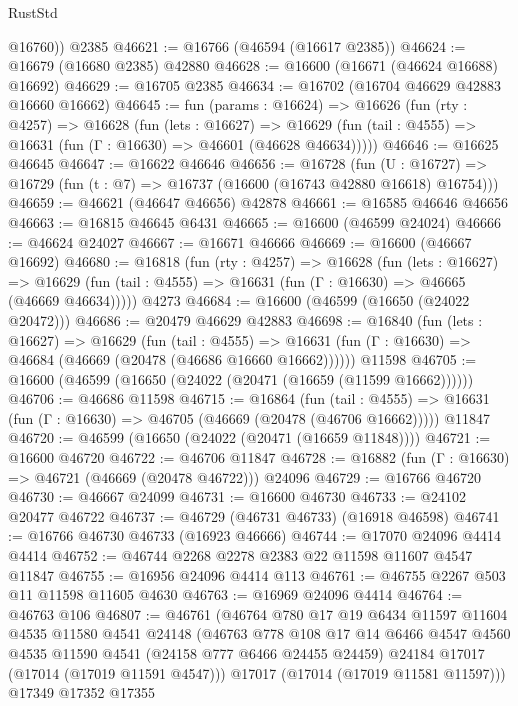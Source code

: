 \begin{lexlean}{RustStd}
\begin{coremodule}
        @16760))
    @2385
@46621 := @16766 (@46594 (@16617 @2385))
@46624 := @16679 (@16680 @2385) @42880
@46628 := @16600 (@16671 (@46624 @16688) @16692)
@46629 := @16705 @2385
@46634 := @16702 (@16704 @46629 @42883 @16660 @16662)
@46645 := fun (params : @16624) =>
  @16626
    (fun (rty : @4257) =>
    @16628
      (fun (lets : @16627) =>
      @16629 (fun (tail : @4555) => @16631 (fun (Γ : @16630) => @46601 (@46628 @46634)))))
@46646 := @16625 @46645
@46647 := @16622 @46646
@46656 := @16728
    (fun (U : @16727) => @16729 (fun (t : @7) => @16737 (@16600 (@16743 @42880 @16618) @16754)))
@46659 := @46621 (@46647 @46656) @42878
@46661 := @16585 @46646 @46656
@46663 := @16815 @46645 @6431
@46665 := @16600 (@46599 @24024)
@46666 := @46624 @24027
@46667 := @16671 @46666
@46669 := @16600 (@46667 @16692)
@46680 := @16818
    (fun (rty : @4257) =>
    @16628
      (fun (lets : @16627) =>
      @16629 (fun (tail : @4555) => @16631 (fun (Γ : @16630) => @46665 (@46669 @46634)))))
    @4273
@46684 := @16600 (@46599 (@16650 (@24022 @20472)))
@46686 := @20479 @46629 @42883
@46698 := @16840
    (fun (lets : @16627) =>
    @16629
      (fun (tail : @4555) =>
      @16631 (fun (Γ : @16630) => @46684 (@46669 (@20478 (@46686 @16660 @16662))))))
    @11598
@46705 := @16600 (@46599 (@16650 (@24022 (@20471 (@16659 (@11599 @16662))))))
@46706 := @46686 @11598
@46715 := @16864
    (fun (tail : @4555) => @16631 (fun (Γ : @16630) => @46705 (@46669 (@20478 (@46706 @16662)))))
    @11847
@46720 := @46599 (@16650 (@24022 (@20471 (@16659 @11848))))
@46721 := @16600 @46720
@46722 := @46706 @11847
@46728 := @16882 (fun (Γ : @16630) => @46721 (@46669 (@20478 @46722))) @24096
@46729 := @16766 @46720
@46730 := @46667 @24099
@46731 := @16600 @46730
@46733 := @24102 @20477 @46722
@46737 := @46729 (@46731 @46733) (@16918 @46598)
@46741 := @16766 @46730 @46733 (@16923 @46666)
@46744 := @17070 @24096 @4414 @4414
@46752 := @46744 @2268 @2278 @2383 @22 @11598 @11607 @4547 @11847
@46755 := @16956 @24096 @4414 @113
@46761 := @46755 @2267 @503 @11 @11598 @11605 @4630
@46763 := @16969 @24096 @4414
@46764 := @46763 @106
@46807 := @46761
    (@46764
      @780
      @17
      @19
      @6434
      @11597
      @11604
      @4535
      @11580
      @4541
      @24148
      (@46763
        @778
        @108
        @17
        @14
        @6466
        @4547
        @4560
        @4535
        @11590
        @4541
        (@24158 @777 @6466 @24455 @24459)
        @24184
        @17017
        (@17014 (@17019 @11591 @4547)))
      @17017
      (@17014 (@17019 @11581 @11597)))
    @17349
    @17352
    @17355

\end{coremodule}
\end{lexlean}
